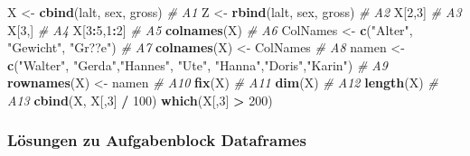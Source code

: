 \documentclass[]{article}
\newenvironment{Shaded}{\begin{snugshade}}{\end{snugshade}}
\newcommand{\KeywordTok}[1]{\textcolor[rgb]{0.13,0.29,0.53}{\textbf{#1}}}
\newcommand{\DecValTok}[1]{\textcolor[rgb]{0.00,0.00,0.81}{#1}}
\newcommand{\StringTok}[1]{\textcolor[rgb]{0.31,0.60,0.02}{#1}}
\newcommand{\CommentTok}[1]{\textcolor[rgb]{0.56,0.35,0.01}{\textit{#1}}}
\newcommand{\OperatorTok}[1]{\textcolor[rgb]{0.81,0.36,0.00}{\textbf{#1}}}
\newcommand{\NormalTok}[1]{#1}
\begin{document}
\begin{Shaded}
\begin{Highlighting}[]
\NormalTok{    X <-}\StringTok{ }\KeywordTok{cbind}\NormalTok{(lalt, sex, gross) }\CommentTok{# A1}
\NormalTok{    Z <-}\StringTok{ }\KeywordTok{rbind}\NormalTok{(lalt, sex, gross) }\CommentTok{# A2}
\NormalTok{    X[}\DecValTok{2}\NormalTok{,}\DecValTok{3}\NormalTok{] }\CommentTok{# A3}
\NormalTok{    X[}\DecValTok{3}\NormalTok{,] }\CommentTok{# A4}
\NormalTok{    X[}\DecValTok{3}\OperatorTok{:}\DecValTok{5}\NormalTok{,}\DecValTok{1}\OperatorTok{:}\DecValTok{2}\NormalTok{]  }\CommentTok{# A5}
    \KeywordTok{colnames}\NormalTok{(X)  }\CommentTok{# A6}
\NormalTok{    ColNames    <-}\StringTok{ }\KeywordTok{c}\NormalTok{(}\StringTok{"Alter"}\NormalTok{, }\StringTok{"Gewicht"}\NormalTok{, }\StringTok{"Gr??e"}\NormalTok{)  }\CommentTok{# A7}
    \KeywordTok{colnames}\NormalTok{(X) <-}\StringTok{ }\NormalTok{ColNames }\CommentTok{# A8}
\NormalTok{    namen       <-}\StringTok{ }\KeywordTok{c}\NormalTok{(}\StringTok{"Walter"}\NormalTok{, }\StringTok{"Gerda"}\NormalTok{,}\StringTok{"Hannes"}\NormalTok{, }\StringTok{"Ute"}\NormalTok{, }\StringTok{"Hanna"}\NormalTok{,}\StringTok{"Doris"}\NormalTok{,}\StringTok{"Karin"}\NormalTok{) }\CommentTok{# A9}
    \KeywordTok{rownames}\NormalTok{(X) <-}\StringTok{ }\NormalTok{namen  }\CommentTok{# A10}
    \KeywordTok{fix}\NormalTok{(X)  }\CommentTok{# A11}
    \KeywordTok{dim}\NormalTok{(X)  }\CommentTok{# A12}
    \KeywordTok{length}\NormalTok{(X)  }\CommentTok{# A13}
    \KeywordTok{cbind}\NormalTok{(X, X[,}\DecValTok{3}\NormalTok{] }\OperatorTok{/}\StringTok{ }\DecValTok{100}\NormalTok{)}
    \KeywordTok{which}\NormalTok{(X[,}\DecValTok{3}\NormalTok{] }\OperatorTok{>}\StringTok{ }\DecValTok{200}\NormalTok{)}
\end{Highlighting}
\end{Shaded}

\subsubsection*{Lösungen zu Aufgabenblock
Dataframes}\label{losungen-zu-aufgabenblock-dataframes}
\end{document}

